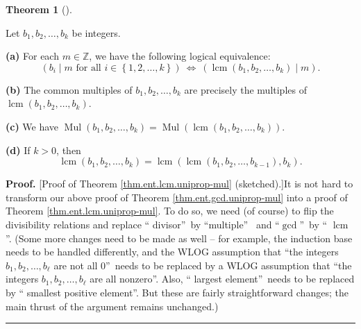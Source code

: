 \documentclass[numbers=enddot,12pt,final,onecolumn,notitlepage]{scrartcl}%
\numberwithin{exer}{subsection}
\theoremstyle{definition}
\newtheorem{theo}{Theorem}[subsection]
\newenvironment{theorem}[1][]
{\begin{theo}[#1]\begin{leftbar}}
{\end{leftbar}\end{theo}}
\newenvironment{proof}[1][Proof]{\noindent\textbf{#1.} }{\ \rule{0.5em}{0.5em}}
\begin{document}
\begin{theorem}
\label{thm.ent.lcm.uniprop-mul}Let $b_{1},b_{2},\ldots,b_{k}$ be integers.

\textbf{(a)} For each $m\in\mathbb{Z}$, we have the following logical
equivalence:%
\[
\left(  b_{i}\mid m\text{ for all }i\in\left\{  1,2,\ldots,k\right\}  \right)
\ \Longleftrightarrow\ \left(  \operatorname{lcm}\left(  b_{1},b_{2}%
,\ldots,b_{k}\right)  \mid m\right)  .
\]


\textbf{(b)} The common multiples of $b_{1},b_{2},\ldots,b_{k}$ are precisely
the multiples of $\operatorname{lcm}\left(  b_{1},b_{2},\ldots,b_{k}\right)  $.

\textbf{(c)} We have $\operatorname*{Mul}\left(  b_{1},b_{2},\ldots
,b_{k}\right)  =\operatorname*{Mul}\left(  \operatorname{lcm}\left(
b_{1},b_{2},\ldots,b_{k}\right)  \right)  $.

\textbf{(d)} If $k>0$, then%
\[
\operatorname{lcm}\left(  b_{1},b_{2},\ldots,b_{k}\right)  =\operatorname{lcm}%
\left(  \operatorname{lcm}\left(  b_{1},b_{2},\ldots,b_{k-1}\right)
,b_{k}\right)  .
\]

\end{theorem}

\begin{proof}
[Proof of Theorem \ref{thm.ent.lcm.uniprop-mul} (sketched).]It is not hard to
transform our above proof of Theorem \ref{thm.ent.gcd.uniprop-mul} into a
proof of Theorem \ref{thm.ent.lcm.uniprop-mul}. To do so, we need (of course)
to flip the divisibility relations and replace \textquotedblleft
divisor\textquotedblright\ by \textquotedblleft multiple\textquotedblright%
\ and \textquotedblleft$\gcd$\textquotedblright\ by \textquotedblleft%
$\operatorname{lcm}$\textquotedblright. (Some more changes need to be made as
well -- for example, the induction base needs to be handled differently, and
the WLOG assumption that \textquotedblleft the integers $b_{1},b_{2}%
,\ldots,b_{\ell}$ are not all $0$\textquotedblright\ needs to be replaced by a
WLOG assumption that \textquotedblleft the integers $b_{1},b_{2}%
,\ldots,b_{\ell}$ are all nonzero\textquotedblright. Also, \textquotedblleft
largest element\textquotedblright\ needs to be replaced by \textquotedblleft
smallest positive element\textquotedblright. But these are fairly
straightforward changes; the main thrust of the argument remains unchanged.)
\end{proof}
\end{document}
